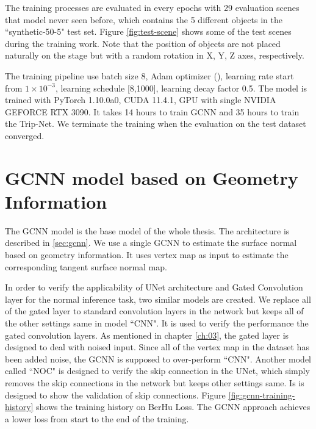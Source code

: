 \documentclass[border=15pt, multi, tikz]{article}
\begin{document}
The training processes are evaluated in every epochs with 29 evaluation scenes that model never seen before, which contains the 5 different objects in the ``synthetic-50-5" test set. Figure \ref{fig:test-scene} shows some of the test scenes during the training work. Note that the position of objects are not placed naturally on the stage but with a random rotation in X, Y, Z axes, respectively.

The training pipeline use batch size $ 8 $,  Adam optimizer (\cite{adam}), learning rate start from  $ 1\times10^{-3} $, learning schedule [8,1000], learning decay factor 0.5. The model is trained with PyTorch 1.10.0a0, CUDA 11.4.1, GPU with single NVIDIA GEFORCE RTX 3090. It takes 14 hours to train GCNN and 35 hours to train the Trip-Net. We terminate the training when the evaluation on the test dataset converged.


\section{GCNN model based on Geometry Information}
The GCNN model is the base model of the whole thesis. The architecture is described in \ref{sec:gcnn}. We use a single GCNN to estimate the surface normal based on geometry information. It uses vertex map as input to estimate the corresponding tangent surface normal map. 

In order to verify the applicability of UNet architecture and Gated Convolution layer for the normal inference task, two similar models are created. 
We replace all of the gated layer to standard convolution layers in the network but keeps all of the other settings same in model ``CNN". It is used to verify the performance the gated convolution layers. As mentioned in chapter \ref{ch:03}, the gated layer is designed to deal with noised input. Since all of the vertex map in the dataset has been added noise, the GCNN is supposed to over-perform ``CNN". Another model called ``NOC" is designed to verify the skip connection in the UNet, which simply removes the skip connections in the network but keeps other settings same. Is is designed to show the validation of skip connections. Figure \ref{fig:gcnn-training-history} shows the training history on BerHu Loss. The GCNN approach achieves a lower loss from start to the end of the training.
\end{document}
